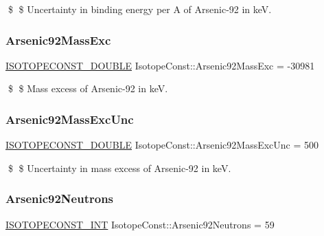 \$ \$ Uncertainty in binding energy per A of Arsenic-\/92 in keV. \mbox{\label{group___isotope_const-_arsenic-_as92_gac07b9a8d23aae132c41f522a08102ccb}} 
\subsubsection{\texorpdfstring{Arsenic92\+Mass\+Exc}{Arsenic92MassExc}}
{\footnotesize\ttfamily \mbox{\hyperlink{group___isotope_const-_macros_ga8f45a7272ce02c0b4c65c44636ed719a}{I\+S\+O\+T\+O\+P\+E\+C\+O\+N\+S\+T\+\_\+\+D\+O\+U\+B\+LE}} Isotope\+Const\+::\+Arsenic92\+Mass\+Exc = -\/30981}

\$ \$ Mass excess of Arsenic-\/92 in keV. \mbox{\label{group___isotope_const-_arsenic-_as92_ga0636c16483e42057407e0f5b391d108b}} 
\subsubsection{\texorpdfstring{Arsenic92\+Mass\+Exc\+Unc}{Arsenic92MassExcUnc}}
{\footnotesize\ttfamily \mbox{\hyperlink{group___isotope_const-_macros_ga8f45a7272ce02c0b4c65c44636ed719a}{I\+S\+O\+T\+O\+P\+E\+C\+O\+N\+S\+T\+\_\+\+D\+O\+U\+B\+LE}} Isotope\+Const\+::\+Arsenic92\+Mass\+Exc\+Unc = 500}

\$ \$ Uncertainty in mass excess of Arsenic-\/92 in keV. \mbox{\label{group___isotope_const-_arsenic-_as92_ga5a12e84ee6cdcfe077889c1896a99f71}} 
\subsubsection{\texorpdfstring{Arsenic92\+Neutrons}{Arsenic92Neutrons}}
{\footnotesize\ttfamily \mbox{\hyperlink{group___isotope_const-_macros_ga5f18360b3e99483a35c32d789e62621c}{I\+S\+O\+T\+O\+P\+E\+C\+O\+N\+S\+T\+\_\+\+I\+NT}} Isotope\+Const\+::\+Arsenic92\+Neutrons = 59}

